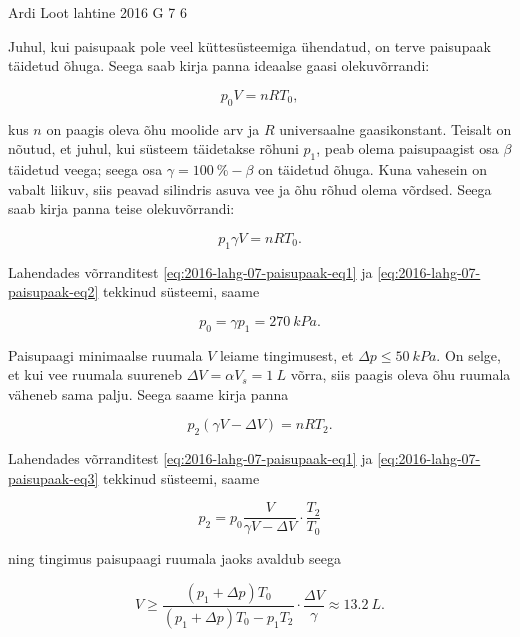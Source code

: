 \documentclass[11pt, twoside]{article}
\begin{document}
{%
{Ardi Loot} %
{lahtine} %
{2016} %
{G 7} %
{6} %
{

\ifSolution
Juhul, kui paisupaak pole veel küttesüsteemiga ühendatud, on terve
paisupaak täidetud õhuga. Seega saab kirja panna ideaalse gaasi olekuvõrrandi:

\begin{equation}
p_{0}V=nRT_{0},\label{eq:2016-lahg-07-paisupaak-eq1}
\end{equation}

\noindent kus $n$ on paagis oleva õhu moolide arv ja $R$ universaalne
gaasikonstant. Teisalt on nõutud, et juhul, kui süsteem täidetakse
rõhuni $p_{1}$, peab olema paisupaagist osa $\beta$ täidetud veega;
seega osa $\gamma=\SI{100}{\%}-\beta$ on täidetud õhuga. Kuna vahesein
on vabalt liikuv, siis peavad silindris asuva vee ja õhu rõhud olema
võrdsed. Seega saab kirja panna teise olekuvõrrandi:

\begin{equation}
p_{1}\gamma V=nRT_{0}.\label{eq:2016-lahg-07-paisupaak-eq2}
\end{equation}


\noindent Lahendades võrranditest \eqref{eq:2016-lahg-07-paisupaak-eq1} ja \eqref{eq:2016-lahg-07-paisupaak-eq2} tekkinud süsteemi, saame

\[
p_{0}=\gamma p_{1}=\SI{270}{kPa}.
\]


\noindent Paisupaagi minimaalse ruumala $V$ leiame tingimusest, et
$\Delta p\leq\SI{50}{kPa}.$ On selge, et kui vee ruumala suureneb
$\Delta V=\alpha V_{s}=\SI{1}{L}$ võrra, siis paagis oleva õhu ruumala
väheneb sama palju. Seega saame kirja panna

\begin{equation}
p_{2}\left(\gamma V-\Delta V\right)=nRT_{2}.\label{eq:2016-lahg-07-paisupaak-eq3}
\end{equation}


\noindent Lahendades võrranditest \eqref{eq:2016-lahg-07-paisupaak-eq1} ja \eqref{eq:2016-lahg-07-paisupaak-eq3}
tekkinud süsteemi, saame

\[
p_{2}=p_{0}\frac{V}{\gamma V-\Delta V}\cdot\frac{T_{2}}{T_{0}}
\]


\noindent ning tingimus paisupaagi ruumala jaoks avaldub seega

\[
V\geq\frac{\left(p_{1}+\Delta p\right)T_{0}}{\left(p_{1}+\Delta p\right)T_{0}-p_{1}T_{2}}\cdot\frac{\Delta V}{\gamma}\approx\SI{13.2}{L}.
\]
\fi
}

}
\end{document}
